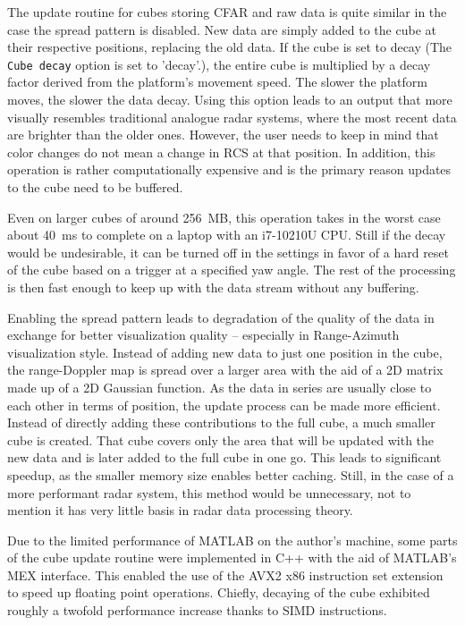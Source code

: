 The update routine for cubes storing CFAR and raw data is quite similar in the case the spread pattern is disabled.
New data are simply added to the cube at their respective positions, replacing the old data.
If the cube is set to decay (The \texttt{Cube decay} option is set to 'decay'.), the entire cube is multiplied by a decay factor derived from the platform’s movement speed.
The slower the platform moves, the slower the data decay.
Using this option leads to an output that more visually resembles traditional analogue radar systems, where the most recent data are brighter than the older ones.
However, the user needs to keep in mind that color changes do not mean a change in RCS at that position.
In addition, this operation is rather computationally expensive and is the primary reason updates to the cube need to be buffered.

Even on larger cubes of around 256~MB, this operation takes in the worst case about 40~ms to complete on a laptop with an i7-10210U CPU.
Still if the decay would be undesirable, it can be turned off in the settings in favor of a hard reset of the cube based on a trigger at a specified yaw angle.
The rest of the processing is then fast enough to keep up with the data stream without any buffering.

Enabling the spread pattern leads to degradation of the quality of the data in exchange for better visualization quality -- especially in Range-Azimuth visualization style.
Instead of adding new data to just one position in the cube, the range-Doppler map is spread over a larger area with the aid of a 2D matrix made up of a 2D Gaussian function.
As the data in series are usually close to each other in terms of position, the update process can be made more efficient.
Instead of directly adding these contributions to the full cube, a much smaller cube is created.
That cube covers only the area that will be updated with the new data and is later added to the full cube in one go.
This leads to significant speedup, as the smaller memory size enables better caching.
Still, in the case of a more performant radar system, this method would be unnecessary, not to mention it has very little basis in radar data processing theory.

Due to the limited performance of MATLAB on the author's machine, some parts of the cube update routine were implemented in C++ with the aid of MATLAB's MEX interface.
This enabled the use of the AVX2 x86 instruction set extension to speed up floating point operations.
Chiefly, decaying of the cube exhibited roughly a twofold performance increase thanks to SIMD instructions.


